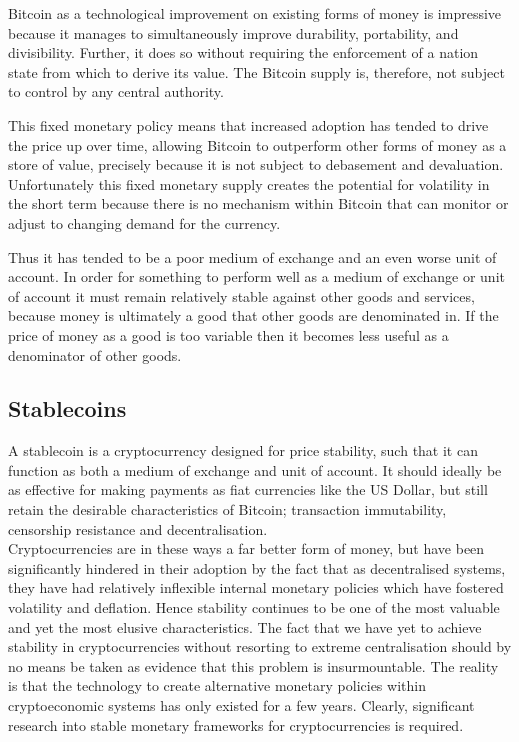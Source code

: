 \noindent Bitcoin as a technological improvement on existing forms of money is impressive because it manages to
simultaneously improve durability, portability, and divisibility.
Further, it does so without requiring the enforcement of a nation state from which to derive its value.
The Bitcoin supply is, therefore, not subject to control by any central authority.

This fixed monetary policy means that increased adoption has tended to drive the price up over time,
allowing Bitcoin to outperform other forms of money as a store of value, precisely because it is not
subject to debasement and devaluation. Unfortunately this fixed monetary supply creates the potential
for volatility in the short term because there is no mechanism within Bitcoin that can monitor or
adjust to changing demand for the currency.

Thus it has tended to be a poor medium of exchange and an even worse unit of account.
In order for something to perform well as a medium of exchange or unit of account it must remain
relatively stable against other goods and services, because money is ultimately a good that other goods
are denominated in. If the price of money as a good is too variable then it becomes less useful as a
denominator of other goods. \\

\subsection{Stablecoins}

\noindent A stablecoin is a cryptocurrency designed for price stability, such that it can function as
both a medium of exchange and unit of account. It should ideally be as effective for making payments
as fiat currencies like the US Dollar, but still retain the desirable characteristics of Bitcoin;
transaction immutability, censorship resistance and decentralisation. \\

\noindent Cryptocurrencies are in these ways a far better form of money, but have been significantly hindered
in their adoption by the fact that as decentralised systems, they have had relatively inflexible internal
monetary policies which have fostered volatility and deflation. Hence stability continues to be one of the
most valuable and yet the most elusive characteristics.
The fact that we have yet to achieve stability in cryptocurrencies without resorting to extreme
centralisation should by no means be taken as evidence that this problem is insurmountable.
The reality is that the technology to create alternative monetary policies within
cryptoeconomic systems has only existed for a few years. Clearly, significant research into stable monetary
frameworks for cryptocurrencies is required. \\

